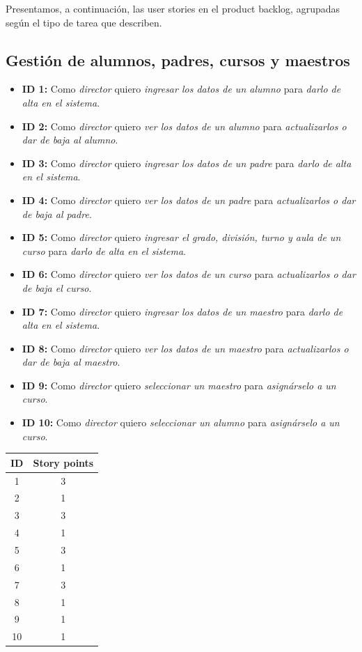 \documentclass[a4paper, 10pt, twoside]{article}
\newenvironment{stories}{
  \begin{itemize}
}{
  \end{itemize}
}
\newcommand{\story}[4]{
  \item
  \textbf{ID #1:} Como \emph{#2} quiero \emph{#3} para \emph{#4}.
}
\begin{document}
Presentamos, a continuación, las user stories en el product backlog, agrupadas según el tipo de tarea que describen.


\subsection{Gestión de alumnos, padres, cursos y maestros}

\begin{stories}
  \story{1}{director}
        {ingresar los datos de un alumno}
        {darlo de alta en el sistema} 

  \story{2}{director}
        {ver los datos de un alumno}
        {actualizarlos o dar de baja al alumno} 

  \story{3}{director}
        {ingresar los datos de un padre}
        {darlo de alta en el sistema} 

  \story{4}{director}
        {ver los datos de un padre}
        {actualizarlos o dar de baja al padre} 

  \story{5}{director}
        {ingresar el grado, división, turno y aula de un curso}
        {darlo de alta en el sistema} 

  \story{6}{director}
        {ver los datos de un curso}
        {actualizarlos o dar de baja el curso} 

  \story{7}{director}
        {ingresar los datos de un maestro}
        {darlo de alta en el sistema} 

  \story{8}{director}
        {ver los datos de un maestro}
        {actualizarlos o dar de baja al maestro} 

  \story{9}{director}
        {seleccionar un maestro}
        {asignárselo a un curso} 

  \story{10}{director}
        {seleccionar un alumno}
        {asignárselo a un curso} 
\end{stories}

\begin{center}
\begin{tabular}{|c|c|}
\hline
ID & Story points\\
\hline
1 & 3\\
2 & 1\\
3 & 3\\
4 & 1\\
5 & 3\\
6 & 1\\
7 & 3\\
8 & 1\\
9 & 1\\
10 & 1\\
\hline
\end{tabular}
\end{center}
\end{document}
